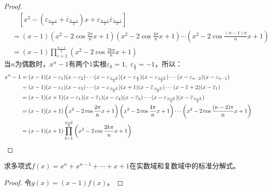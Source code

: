 \begin{proof}
\begin{align*}
		&\quad[x^2-(\varepsilon_\frac{n-1}{2}+\overline{\varepsilon}_\frac{n-1}{2})x+\varepsilon_\frac{n-1}{2}\overline{\varepsilon}_\frac{n-1}{2}] \\
		&=(x-1)\left(x^2-2\cos\frac{2\pi}{n}x+1\right)\left(x^2-2\cos\frac{4\pi}{n}x+1\right)\cdots\left(x^2-2\cos\frac{(n-1)\pi}{n}x+1\right) \\
		&=(x-1)\prod_{i=1}^{\frac{n-1}{2}}\left(x^2-2\cos\frac{2k\pi}{n}x+1\right)
	\end{align*}
	当$n$为偶数时，$x^n-1$有两个1实根$\varepsilon_0=1,\;\varepsilon_\frac{n}{2}=-1$，所以：
	\begin{align*}
		x^n-1
		&=(x-1)(x-\varepsilon_1)(x-\varepsilon_2)\cdots(x-\varepsilon_\frac{n-2}{2})(x-\varepsilon_\frac{n}{2})(x-\varepsilon_\frac{n+2}{2})\cdots(x-\varepsilon_{n-2})(x-\varepsilon_{n-1}) \\
		&=(x-1)(x-\varepsilon_1)(x-\varepsilon_2)\cdots(x-\varepsilon_\frac{n-2}{2})(x+1)(x-\overline{\varepsilon}_\frac{n-2}{2})\cdots(x-\overline{\varepsilon}+2)(x-\overline{\varepsilon}_1) \\
		&=(x-1)(x+1)(x-\varepsilon_1)(x-\overline{\varepsilon}_1)(x-\varepsilon_2)(x-\overline{\varepsilon}_2)\cdots(x-\varepsilon_\frac{n-2}{2})(x-\overline{\varepsilon}_\frac{n-2}{2}) \\
		&=(x-1)(x+1)\left(x^2-2\cos\frac{2\pi}{n}x+1\right)\left(x^2-2\cos\frac{4\pi}{n}x+1\right)\cdots\left(x^2-2\cos\frac{(n-2)\pi}{n}x+1\right) \\
		&=(x-1)(x+1)\prod_{k=1}^{\frac{n-2}{2}}\left(x^2-2\cos\frac{2k\pi}{n}x+1\right)\qedhere
	\end{align*}
\end{proof}

\begin{theorem}
	求多项式$f(x)=x^n+x^{n-1}+\cdots+x+1$在实数域和复数域中的标准分解式。
\end{theorem}
\begin{proof}
	令$g(x)=(x-1)f(x)$。	
\end{proof}